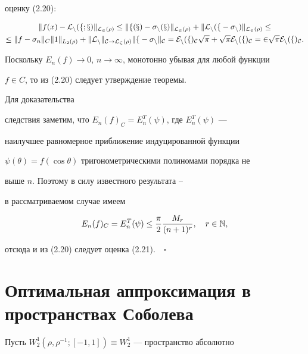 оценку (2.20):


\begin{multline*}


\|f(x)-\cal{L}_n(f;x)\|_{L_2(\rho)}\le \|f(x)-\si_n(x)\|_{L_2(\rho)}


+\|\cal{L}_n(f-\si_n)\|_{L_2(\rho)}\le \\


%


\le \|f-\si_n\|_C\|1\|_{L_2(\rho)}+\|\cal{L}_n\|_{C\to


L_2(\rho)} \|f-\si_n\|_C=E_n(f)_C\sqrt{\pi}+\sqrt{\pi}E_n(f)_C=


2\sqrt{\pi}E_n(f)_C.


\end{multline*}





Поскольку $E_n(f)\to 0$, $n\to \infty$, монотонно убывая для любой функции 


$f\in C$, то из (2.20) следует утверждение теоремы. 





Для доказательства 


следствия заметим, что $E_n(f)_C=E_n^T(\psi)$, где $E_n^T(\psi)$ --- 


наилучшее равномерное приближение индуцированной функции


$\psi(\theta)=f(\cos \theta)$ тригонометрическими полиномами порядка не 


выше $n$. Поэтому в силу известного результата \cite{13}--\cite{15}


в рассматриваемом случае имеем


$$


E_n(f)_C=E_n^T(\psi)\le \frac{\pi}{2}\frac{M_r}{(n+1)^r},\quad r\in \N,


$$


отсюда и из (2.20) следует оценка (2.21).$\quad\square$








\section{Оптимальная аппроксимация в пространствах Соболева}





Пусть $W_2^1(\rho,\rho^{-1};[-1,1])\equiv W_2^1$ --- пространство абсолютно 



